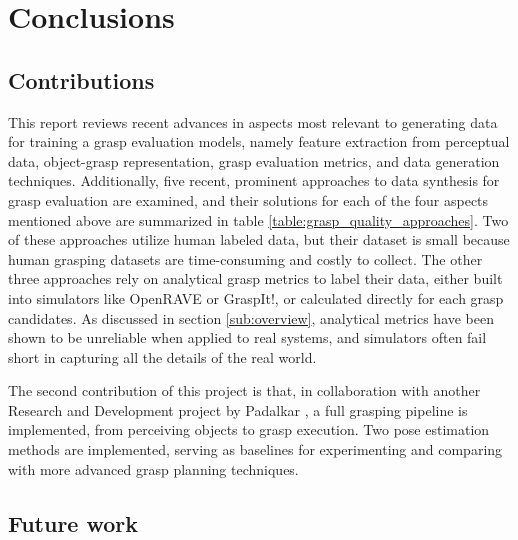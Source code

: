 
\chapter{Conclusions}


\section{Contributions}

This report reviews recent advances in aspects most relevant to generating data for training a grasp evaluation models,
namely feature extraction from perceptual data, object-grasp representation, grasp evaluation metrics, and data
generation techniques. Additionally, five recent, prominent approaches to data synthesis for grasp evaluation are
examined, and their solutions for each of the four aspects mentioned above are summarized in table
\ref{table:grasp_quality_approaches}. Two of these approaches utilize human labeled data, but their dataset is small
because human grasping datasets are time-consuming and costly to collect. The other three approaches rely on analytical
grasp metrics to label their data, either built into simulators like OpenRAVE or GraspIt!, or calculated directly for
each grasp candidates. As discussed in section \ref{sub:overview}, analytical metrics have been shown to be
unreliable when applied to real systems, and simulators often fail short in capturing all the details of the real world.

The second contribution of this project is that, in collaboration with another Research and Development project by
Padalkar \cite{Padalkar2018}, a full grasping pipeline is implemented, from perceiving objects to grasp execution. Two
pose estimation methods are implemented, serving as baselines for experimenting and comparing with more advanced grasp
planning techniques.


\section{Future work}

